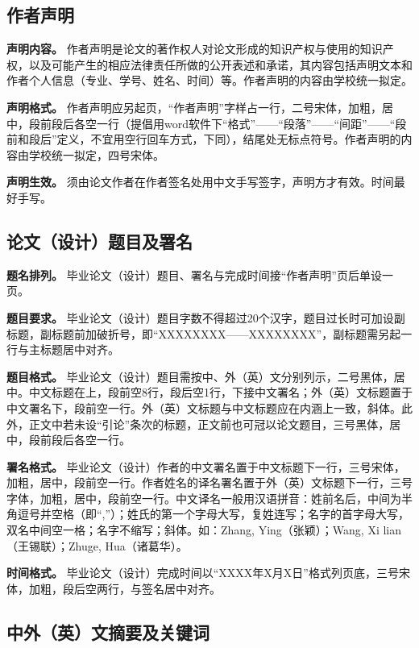 \documentclass[doublesided]{Style/ucasthesis}%
\begin{document}
\hypertarget{section-14}{%
\subsection{作者声明}\label{section-14}}

\textbf{声明内容。} 作者声明是论文的著作权人对论文形成的知识产权与使用的知识产权，以及可能产生的相应法律责任所做的公开表述和承诺，其内容包括声明文本和作者个人信息（专业、学号、姓名、时间）等。作者声明的内容由学校统一拟定。

\textbf{声明格式。} 作者声明应另起页，``作者声明''字样占一行，二号宋体，加粗，居中，段前段后各空一行（提倡用word软件下``格式''------``段落''------``间距''------``段前和段后''定义，不宜用空行回车方式，下同），结尾处无标点符号。作者声明的内容由学校统一拟定，四号宋体。

\textbf{声明生效。} 须由论文作者在作者签名处用中文手写签字，声明方才有效。时间最好手写。

\hypertarget{section-15}{%
\subsection{论文（设计）题目及署名}\label{section-15}}

\textbf{题名排列。} 毕业论文（设计）题目、署名与完成时间接``作者声明''页后单设一页。

\textbf{题目要求。} 毕业论文（设计）题目字数不得超过20个汉字，题目过长时可加设副标题，副标题前加破折号，即``XXXXXXXX------XXXXXXXX''，副标题需另起一行与主标题居中对齐。

\textbf{题目格式。} 毕业论文（设计）题目需按中、外（英）文分别列示，二号黑体，居中。中文标题在上，段前空8行，段后空1行，下接中文署名；外（英）文标题置于中文署名下，段前空一行。外（英）文标题与中文标题应在内涵上一致，斜体。此外，正文中若未设``引论''条次的标题，正文前也可冠以论文题目，三号黑体，居中，段前段后各空一行。

\textbf{署名格式。} 毕业论文（设计）作者的中文署名置于中文标题下一行，三号宋体，加粗，居中，段前空一行。作者姓名的译名署名置于外（英）文标题下一行，三号字体，加粗，居中，段前空一行。中文译名一般用汉语拼音：姓前名后，中间为半角逗号并空格（即``,''）；姓氏的第一个字母大写，复姓连写；名字的首字母大写，双名中间空一格；名字不缩写；斜体。如：Zhang, Ying（张颖）；Wang, Xi lian（王锡联）；Zhuge, Hua（诸葛华）。

\textbf{时间格式。} 毕业论文（设计）完成时间以``XXXX年X月X日''格式列页底，三号宋体，加粗，段后空两行，与签名居中对齐。

\hypertarget{section-16}{%
\subsection{中外（英）文摘要及关键词}\label{section-16}}
\end{document}
